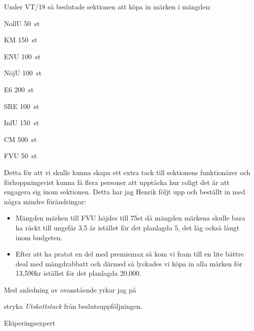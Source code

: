 \documentclass[../_main/handlingar.tex]{subfiles}
\begin{document}

Under VT/18 så beslutade sektionen att köpa in märken i mängden:

\begin{emptylist}
    \item NollU \SI{50}{st}
    \item KM \SI{150}{st}
    \item ENU \SI{100}{st}
    \item NöjU \SI{100}{st}
    \item E6 \SI{200}{st}
    \item SRE \SI{100}{st}
    \item InfU \SI{150}{st}
    \item CM \SI{500}{st}
    \item FVU \SI{50}{st}
\end{emptylist}

Detta för att vi skulle kunna skapa ett extra tack till sektionens funktionärer och förhoppningsvist kunna få flera personer att upptäcka hur roligt det är att engagera sig inom sektionen. Detta har jag Henrik följt upp och beställt in med några mindre förändringar:

\begin{itemize}
    \item Mängden märken till FVU höjdes till 75st då mängden märkena skulle bara ha räckt till ungefär 3,5 år istället för det planlagda 5, det låg också långt inom budgeten.
    \item Efter att ha pratat en del med premiemax så kom vi fram till en lite bättre deal med mängdrabbatt och därmed så lyckades vi köpa in alla märken för 13,590kr istället för det planlagda 20,000.
\end{itemize}

Med anledning av ovanstående yrkar jag på

\begin{attsatser}
    \att stryka \emph{Utskottstack} från beslutsuppföljningen.
\end{attsatser}

\begin{signatures}{1}
    \mvh
    \signature{Henrik Ramström}{Ekiperingsexpert}
\end{signatures}
\end{document}
